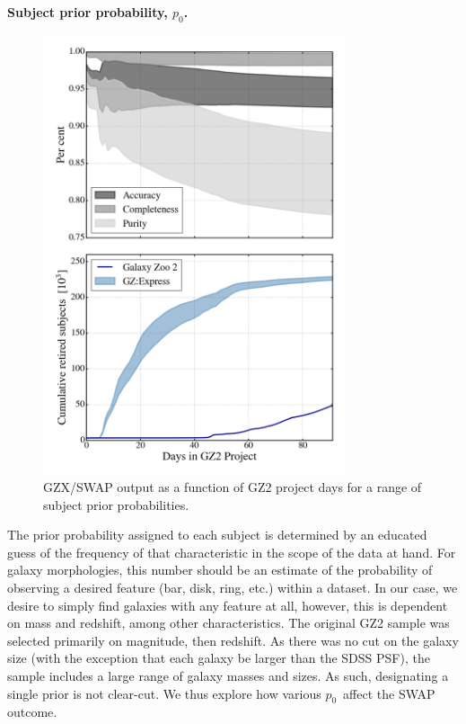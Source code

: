 \documentclass[twocolumn]{aastex6}
\newcommand{\p}{$p_0$}
\begin{document}
\textbf{Subject prior probability, \p.}
\begin{figure}[t!]
\includegraphics[width=3.5in]{figures/GZX_eval_and_retirement_prior_spread_4paper.png}
\caption{GZX/SWAP output as a function of GZ2 project days for a range of subject prior probabilities.  \label{fig: priorAnalysis}}
\end{figure}
The prior probability assigned to each subject is determined by an educated guess of 
the frequency of that characteristic in the scope of the data at hand. 
For galaxy morphologies, this number should be an estimate of the probability
of observing a desired feature (bar, disk, ring, etc.) within a dataset. In our case, 
we desire to simply find galaxies with any feature at all, however, this is dependent 
on mass and redshift, among other characteristics. The original GZ2 sample was selected
primarily on magnitude, then redshift.  As there was no cut on the galaxy size
(with the exception that each galaxy be larger than the SDSS PSF), the sample
includes a large range of galaxy masses and sizes. As such, designating a single 
prior is not clear-cut. We thus explore how various \p~affect the SWAP outcome.
\end{document}

